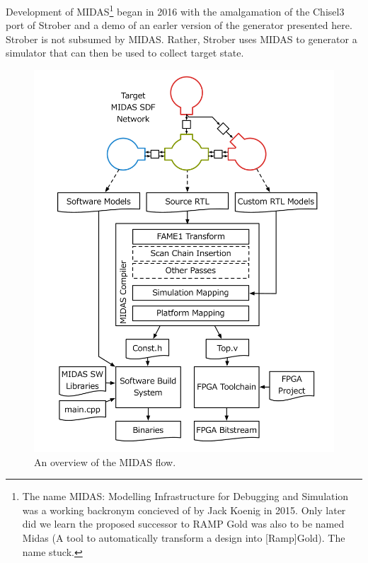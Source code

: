 Development of MIDAS\footnote{The name MIDAS: Modelling Infrastructure for
Debugging and Simulation was a working backronym concieved of by Jack Koenig in
2015. Only later did we learn the proposed successor to RAMP Gold was also to
be named Midas (A tool to automatically transform a design into [Ramp]Gold).
The name stuck.} began in 2016 with the amalgamation of the Chisel3 port of
Strober and a demo of an earler version of the generator presented here.
Strober is not subsumed by MIDAS.  Rather, Strober uses MIDAS to generator a
simulator that can then be used to collect target state.

\begin{figure}
	\centering
	\includegraphics[width=16cm]{figures/toolchain.pdf}
	\caption{An overview of the MIDAS flow.  }
	\label{fig:midas}
\end{figure}

